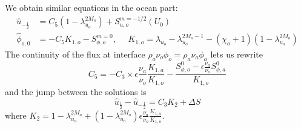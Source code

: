 We obtain similar equations in the ocean part:
\begin{equation}
	\begin{aligned}
		\widehat{u}_{-\frac{1}{2}} &= {C}_5 (1 -
			\lambda_{u_o}^{2M_o})
			+ S_{u, o}^{m=-1/2}(U_0) \\
		\widehat{\phi}_{o,0} &= - {C}_5 K_{1,o}
		-S_{\phi,o}^{m=0},
		~~~~~~ K_{1,o} = 
			\lambda_{u_o}-\lambda_{u_o}^{2M_o-1}
			- (\chi_o+1)(1-\lambda_{u_o}^{2M_o})
	\end{aligned}
\end{equation}
The continuity of the flux at interface
$\rho_o \nu_o \phi_o = \rho_a \nu_a \phi_a$ lets us rewrite
\begin{equation}
{C}_5 = - {C}_3 \times \epsilon
	\frac{\nu_a}{\nu_o} \frac{K_{1,a}}{K_{1,o}} -
	\frac{S_{\phi,o}^0 - \epsilon \frac{\nu_a}{\nu_o}
	S^0_{\phi, a}}{K_{1,o}}
\end{equation}
and the jump between the solutions is
\begin{equation}
	\widehat{u}_{\frac{1}{2}} - \widehat{u}_{-\frac{1}{2}}
	= {C}_3 K_{2} + \Delta S
\end{equation}
where $K_{2} = 1 - \lambda_{u_a}^{2M_a} + (1 - \lambda_{u_o}^{2M_o})
\epsilon \frac{\nu_a}{\nu_o} \frac{K_{1,a}}{K_{1,o}}$.
